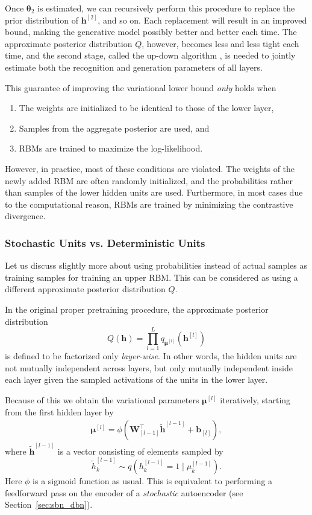 \documentclass[dissertation,nocontribution,draft*]{aaltoseries}
\newcommand{\qlay}[1]{\left[#1\right]}
\newcommand{\vect}[1]{\mathbf{#1}}
\newcommand{\vects}[1]{\boldsymbol{#1}}
\newcommand{\matr}[1]{\mathbf{#1}}
\newcommand{\vb}[0]{\vect{b}}
\newcommand{\vh}[0]{\vect{h}}
\newcommand{\mW}[0]{\matr{W}}
\newcommand{\vmu}[0]{\vects{\mu}}
\newcommand{\TT}[0]{{\vects{\theta}}}
\begin{document}
Once $\TT_2$ is estimated, we can recursively perform this
procedure to replace the prior distribution of
$\vh^{\qlay{2}}$, and so on.  Each replacement will result
in an improved bound, making the generative model possibly
better and better each time.  The approximate posterior
distribution $Q$, however, becomes less and less tight each
time, and the second stage, called the up-down algorithm
\citep{Hinton2006nc}, is needed to jointly estimate both the
recognition and generation parameters of all layers.  

This guarantee of improving the variational lower bound
\textit{only} holds when
\begin{enumerate}
        \vspace{-5mm}
    \itemsep 0em
    \item The weights are initialized to be identical to
        those of the lower layer,
    \item Samples from the aggregate posterior are used, and
    \item RBMs are trained to maximize the log-likelihood.
\end{enumerate}

However, in practice, most of these conditions are violated. The weights
of the newly added RBM are often randomly initialized, and
the probabilities rather than samples of the lower hidden
units are used. Furthermore, in most cases due to the
computational reason, RBMs are trained by minimizing the
contrastive divergence. 

\subsubsection{Stochastic Units vs. Deterministic Units}
\label{sec:det_vs_sto}

Let us discuss slightly more about using probabilities
instead of actual samples as training samples for training
an upper RBM. This can be considered as using a different
approximate posterior distribution $Q$.

In the original proper pretraining procedure, the
approximate posterior distribution
\[
Q(\vh) = \prod_{l=1}^L q_{\vmu^{\qlay{l}}}\left(
\vh^{\qlay{l}} \right)
\]
is defined to be factorized only \textit{layer-wise}. In
other words, the hidden units are not mutually independent
across layers, but only mutually independent inside each
layer given the sampled activations of the units in the
lower layer.

Because of this we obtain the variational parameters
$\vmu^{\qlay{l}}$ iteratively, starting from the first hidden
layer by
\begin{align}
    \label{eq:dbn_posterior}
    \vmu^{\qlay{l}} = \phi\left( \mW_{\qlay{l-1}}^\top
    \tilde{\vh}^{\qlay{l-1}} + \vb_{\qlay{l}} \right),
\end{align}
where $\tilde{\vh}^{\qlay{l-1}}$ is a vector consisting of
elements sampled by 
\[
\tilde{h}_k^{\qlay{l-1}} \sim q\left(h_k^{\qlay{l-1}} = 1 \mid
\mu_k^{\qlay{l-1}}\right).
\]
Here $\phi$ is a sigmoid function as usual. This is
equivalent to performing a feedforward pass on the encoder
of a \textit{stochastic} autoencoder (see
Section~\ref{sec:sbn_dbn}).
\end{document}
